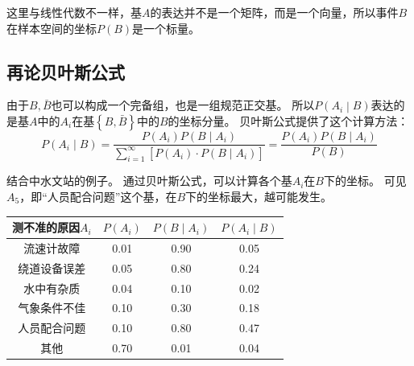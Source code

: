 这里与线性代数不一样，基$A$的表达并不是一个矩阵，而是一个向量，所以事件$B$在样本空间的坐标$P\left( B \right) $是一个标量。

\subsection{再论贝叶斯公式}

由于$B,\bar{B}$也可以构成一个完备组，也是一组规范正交基。
所以$P\left( A_i \middle| B \right) $表达的是基$A$中的$A_i$在基$\left\{ B,\bar{B} \right\} $中的$B$的坐标分量。
贝叶斯公式提供了这个计算方法：
\[
P\left( A_i \middle| B \right) =\frac{P\left( A_i \right) P\left( B \middle| A_i \right)}{\sum_{i=1}^{\infty}{\left[ P\left( A_i \right) \cdot P\left( B \middle| A_i \right) \right]}}=\frac{P\left( A_i \right) P\left( B \middle| A_i \right)}{P\left( B \right)}
\]

结合中水文站的例子。
通过贝叶斯公式，可以计算各个基$A_i$在$B$下的坐标。
可见$A_5$，即“人员配合问题”这个基，在$B$下的坐标最大，越可能发生。
\begin{table}[h]
    \centering
    \begin{tabular}{cccc}
        \toprule
        测不准的原因$A_i$ & $P\left( A_i \right) $ & $P\left( B \middle| A_i \right) $ & $P\left( A_i \middle| B \right) $\\
        \midrule
        流速计故障 & 0.01 & 0.90 & 0.05\\
        绕道设备误差 & 0.05 & 0.80 & 0.24\\
        水中有杂质 & 0.04 & 0.10 & 0.02\\
        气象条件不佳 & 0.10 & 0.30 & 0.18\\
        人员配合问题 & 0.10 & 0.80 & 0.47\\
        其他 & 0.70 & 0.01 & 0.04\\
        \bottomrule
    \end{tabular}
\end{table}




